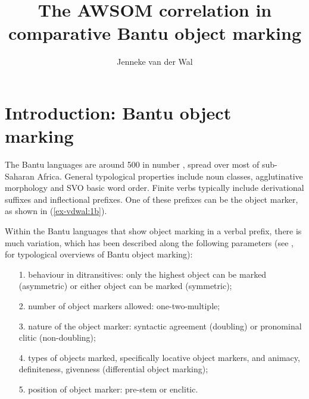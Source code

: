 \documentclass[output=paper
,modfonts
,nonflat]{langsci/langscibook}
\title{The AWSOM correlation in comparative Bantu object marking}
\author{Jenneke van der Wal\affiliation{Leiden University Centre for Linguistics}}
\begin{document}
	
\maketitle	
\section{Introduction: Bantu object marking} \label{sec-vdwal:1}


The Bantu languages are around 500 in number \citep[1]{Nurse_Philippson2003}, spread over most of sub-Saharan Africa. General typological properties include noun classes, agglutinative morphology and SVO basic word order. Finite verbs typically include derivational suffixes and inflectional prefixes. One of these prefixes can be the object marker, as shown in (\ref{ex-vdwal:1b}).

\noindent Within the Bantu languages that show object marking in a verbal prefix, there is much variation, which has been described along the following parameters (see \citealt{Hyman_Duranti1982,Polak1986,Morimoto2002,Beaudoin-Lietz_et_al2004,Marten_et_al2007,Riedel2009,Marten_Kula2012,Zeller2014,Marlo2015}, for typological overviews of Bantu object marking):
\begin{enumerate}
\item[1.]behaviour in ditransitives: only the highest object can be marked (asymmetric) or either object can be marked (symmetric); 
\item[2.]number of object markers allowed: one-two-multiple;
\item[3.]nature of the object marker: syntactic agreement (doubling) or pronominal clitic (non-doubling);
\item[4.]types of objects marked, specifically locative object markers, and animacy, definiteness, givenness (differential object marking);
\item [5.]position of object marker: pre-stem or enclitic.
\end{enumerate}
\end{document}
